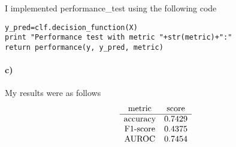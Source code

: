 \documentclass[12pt]{article}
\begin{document}
I implemented performance\_test using the following code
\begin{verbatim}
y_pred=clf.decision_function(X)
print "Performance test with metric "+str(metric)+":"
return performance(y, y_pred, metric)
\end{verbatim}

\paragraph{c)}

My results were as follows
\[
        \begin{array}{c c}
                \text{metric} & \text{score}\\
                \hline
                \text{accuracy} & 0.7429\\
                \text{F1-score} & 0.4375\\
                \text{AUROC} & 0.7454
        \end{array}
\]
\end{document}
